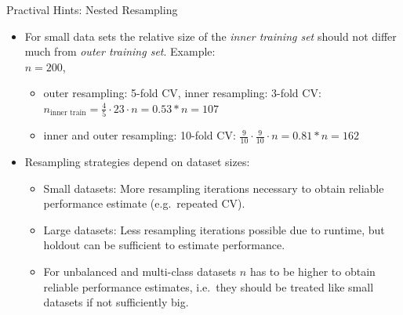 \begin{frame}{Practival Hints: Nested Resampling}
\begin{itemize}
   \item For small data sets the relative size of the \emph{inner training set} should not differ much from \emph{outer training set}. Example: \\$n = 200$, 
   \begin{itemize}
     \item outer resampling: 5-fold CV, inner resampling: 3-fold CV: $n_{\text{inner train}} = \frac{4}{5} \cdot {2}{3} \cdot n = 0.53 * n = 107$
     \item inner and outer resampling: 10-fold CV: $\frac{9}{10} \cdot \frac{9}{10} \cdot n = 0.81 * n = 162$ 
   \end{itemize}
   \item Resampling strategies depend on dataset sizes:
  \begin{itemize}
    \item Small datasets: More resampling iterations necessary to obtain reliable performance estimate (e.g.\ repeated CV).
    \item Large datasets: Less resampling iterations possible due to runtime, but holdout can be sufficient to estimate performance.
    \item For unbalanced and multi-class datasets $n$ has to be higher to obtain reliable performance estimates, i.e.\ they should be treated like small datasets if not sufficiently big.
  \end{itemize} 
\end{itemize}
\end{frame}

